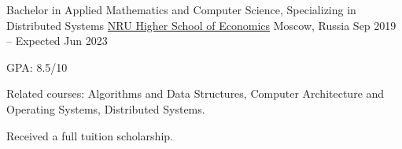

\begin{cventries}

  \cventry
  {Bachelor in Applied Mathematics and Computer Science, Specializing in Distributed Systems} %
  {\href{https://www.hse.ru/en/}{NRU Higher School of Economics}} %
  {Moscow, Russia} %
  {Sep 2019 -- Expected Jun 2023} %
  {
    \begin{cvitems} %
      \item GPA: 8.5/10
      \item Related courses:
      Algorithms and Data Structures,
      Computer Architecture and Operating Systems,
      Distributed Systems.
      \item Received a full tuition scholarship.
    \end{cvitems}
  }

\end{cventries}
